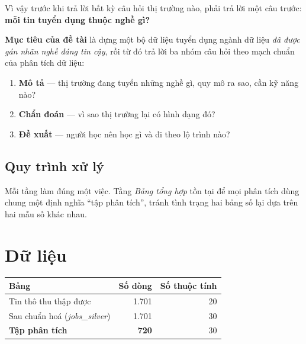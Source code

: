 \documentclass[10pt]{article}
\begin{document}
Vì vậy trước khi trả lời bất kỳ câu hỏi thị trường nào, phải trả lời một câu trước:
\textbf{mỗi tin tuyển dụng thuộc nghề gì?}

\textbf{Mục tiêu của đề tài} là dựng một bộ dữ liệu tuyển dụng ngành dữ liệu \emph{đã được gán nhãn nghề
đáng tin cậy}, rồi từ đó trả lời ba nhóm câu hỏi theo mạch chuẩn của phân tích dữ liệu:

\begin{enumerate}
\item \textbf{Mô tả} --- thị trường đang tuyển những nghề gì, quy mô ra sao, cần kỹ năng nào?
\item \textbf{Chẩn đoán} --- vì sao thị trường lại có hình dạng đó?
\item \textbf{Đề xuất} --- người học nên học gì và đi theo lộ trình nào?
\end{enumerate}

\subsection{Quy trình xử lý}

\begin{center}
\small
{}
\end{center}

Mỗi tầng làm đúng một việc. Tầng \emph{Bảng tổng hợp} tồn tại để mọi phân tích dùng chung một định nghĩa
``tập phân tích'', tránh tình trạng hai bảng số lại dựa trên hai mẫu số khác nhau.

\section{Dữ liệu}

\begin{center}
\small
\begin{tabular}{lrr}
\toprule
\textbf{Bảng} & \textbf{Số dòng} & \textbf{Số thuộc tính} \\
\midrule
Tin thô thu thập được          & 1.701 & 20 \\
Sau chuẩn hoá (\textit{jobs\_silver}) & 1.701 & 30 \\
\textbf{Tập phân tích}         & \textbf{720} & 30 \\
\bottomrule
\end{tabular}
\end{center}
\end{document}
